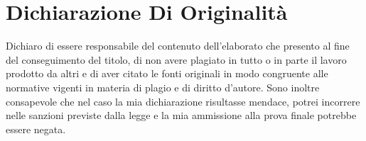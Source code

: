 \chapter*{Dichiarazione Di Originalità}

Dichiaro di essere responsabile del contenuto dell'elaborato che presento
al fine del conseguimento del titolo, di non avere plagiato in tutto o in
parte il lavoro prodotto da altri e di aver citato le fonti originali in
modo congruente alle normative vigenti in materia di plagio e di diritto
d'autore. Sono inoltre consapevole che nel caso la mia dichiarazione
risultasse mendace, potrei incorrere nelle sanzioni previste dalla legge e
la mia ammissione alla prova finale potrebbe essere negata.

